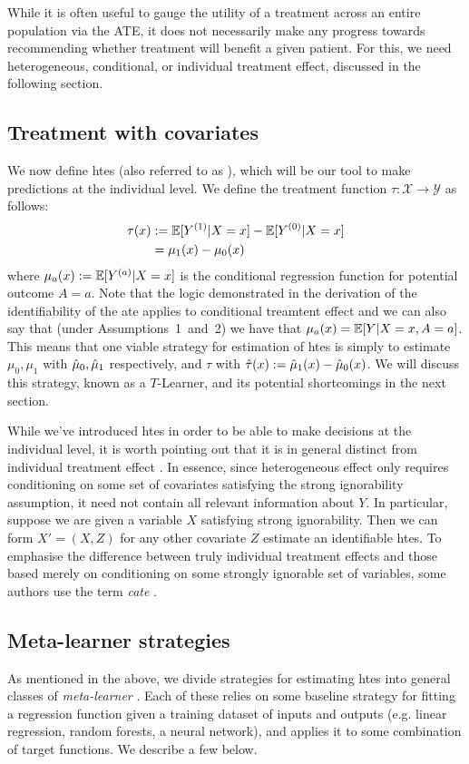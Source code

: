\documentclass[../thesis.tex]{subfiles}
\begin{document}
While it is often useful to gauge the utility of a treatment across an entire population via the ATE, it does not necessarily make any progress towards recommending whether treatment will benefit a given patient. For this, we need heterogeneous, conditional, or individual treatment effect, discussed in the following section.

\subsection{Treatment with covariates}
We now define \glspl{hte} (also referred to as 
), which will be our tool to make predictions at the individual level. We define the treatment function $\tau: \mathcal{X} \rightarrow \mathcal{Y}$ as follows:
\begin{align*}
    \tau(x) & := \mathbb{E}[Y^{(1)} | X =x] - \mathbb{E}[Y^{(0)} | X=x] \\
    & = \mu_1(x) - \mu_0(x) 
\end{align*}
where $\mu_a(x) := \mathbb{E}[Y^{(a)}|X=x]$ is the conditional regression function for potential outcome $A=a$. Note that the logic demonstrated in the derivation of the identifiability of the \gls{ate} applies to conditional treamtent effect and we can also say that (under Assumptions~1~and~2) we have that $\mu_a(x) = \mathbb{E}[Y|X=x,A=a]$. This means that one viable strategy for estimation of \glspl{hte} is simply to estimate $\mu_0,\mu_1$ with $\hat{\mu}_0, \hat{\mu}_1$ respectively, and $\tau$ with $\hat{\tau}(x) := \hat{\mu}_1(x) - \hat{\mu}_0(x)$. We will discuss this strategy, known as a $T$-Learner, and its potential shortcomings in the next section.

While we've introduced \glspl{hte} in order to be able to make decisions at the individual level, it is worth pointing out that it is in general distinct from individual treatment effect \citep{vegetabile_distinction_2021}. In essence, since heterogeneous effect only requires conditioning on some set of covariates satisfying the strong ignorability assumption, it need not contain all relevant information about $Y$. In particular, suppose we are given a variable $X$ satisfying strong ignorability. Then we can form $X'=(X,Z)$ for any other covariate $Z$ estimate an identifiable \glspl{hte}. To emphasise the difference between truly individual treatment effects and those based merely on conditioning on some strongly ignorable set of variables, some authors use the term \emph{\gls{cate}} \citep{vegetabile_distinction_2021}.

\subsection{Meta-learner strategies}
\label{sec:metalearners}
As mentioned in the above, we divide strategies for estimating \glspl{hte} into general classes of \emph{meta-learner} \citep{kunzel_metalearners_2019, curth_nonparametric_2021}. Each of these relies on some baseline strategy for fitting a regression function given a training dataset of inputs and outputs (e.g. linear regression, random forests, a neural network), and applies it to some combination of target functions. We describe a few below.
\end{document}
